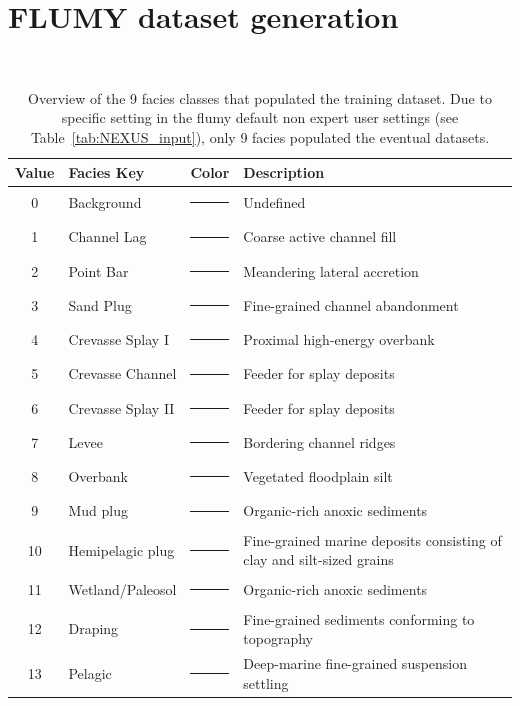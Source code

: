 \chapter{FLUMY dataset generation}
\
\begin{table}[htbp!]
    \centering
    \renewcommand{\arraystretch}{1.2}
    \begin{tabular}{c p{} l p{}}
        \hline
        \textbf{Value} & \textbf{Facies Key} & \textbf{Color} & \textbf{Description} \\
        \hline
        0 & Background & \textcolor[HTML]{FF0000}{\rule{10pt}{10pt}} & Undefined \\
        1 & Channel Lag & \textcolor[HTML]{F1970F}{\rule{10pt}{10pt}} & Coarse active channel fill \\
        2 & Point Bar & \textcolor[HTML]{F3DD12}{\rule{10pt}{10pt}} & Meandering lateral accretion \\
        3 & Sand Plug & \textcolor[HTML]{AF8F00}{\rule{10pt}{10pt}} & Fine-grained channel abandonment \\
        4 & Crevasse Splay I & \textcolor[HTML]{FFFC65}{\rule{10pt}{10pt}} & Proximal high-energy overbank \\
        5 & Crevasse Channel & \textcolor[HTML]{FFD986}{\rule{10pt}{10pt}} & Feeder for splay deposits \\
        6 & Crevasse Splay II & \textcolor[HTML]{FF9853}{\rule{10pt}{10pt}} & Feeder for splay deposits \\
        7 & Levee & \textcolor[HTML]{27AE60}{\rule{10pt}{10pt}} & Bordering channel ridges \\
        8 & Overbank & \textcolor[HTML]{33FF00}{\rule{10pt}{10pt}} & Vegetated floodplain silt \\
        9 & Mud plug & \textcolor[HTML]{FFF7DB}{\rule{10pt}{10pt}} & Organic-rich anoxic sediments \\
        10 & Hemipelagic plug & \textcolor[HTML]{7A7D80}{\rule{10pt}{10pt}} & Fine-grained marine deposits consisting of clay and silt-sized grains \\
        11 & Wetland/Paleosol & \textcolor[HTML]{D862F0}{\rule{10pt}{10pt}} & Organic-rich anoxic sediments \\
        12 & Draping & \textcolor[HTML]{8DD5E7}{\rule{10pt}{10pt}} & Fine-grained sediments conforming to topography \\
        13 & Pelagic & \textcolor[HTML]{3498DB}{\rule{10pt}{10pt}} & Deep-marine fine-grained suspension settling \\
        \hline
    \end{tabular}
    \caption{Overview of the 9 facies classes that populated the training dataset. Due to specific setting in the flumy default non expert user settings (see Table~\ref{tab:NEXUS_input}), only 9 facies populated the eventual datasets.}\label{tab:appendix_facies_config_overview}
\end{table}


